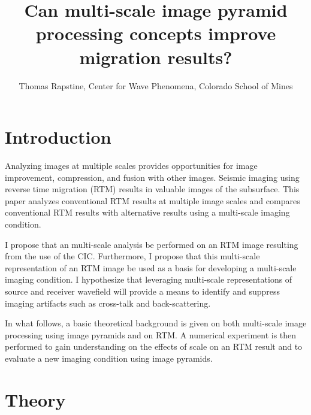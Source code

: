 \title{Can multi-scale image pyramid processing concepts improve migration results?}
\author{Thomas Rapstine, Center for Wave Phenomena, Colorado School of Mines}

%

\def\req{equation~\ref}
\def\rfn#1{\ref{fig:#1}}


\maketitle
{}



\section{Introduction}

Analyzing images at multiple scales provides opportunities for image improvement, compression, and fusion with other images.  Seismic imaging using reverse time migration (RTM) results in valuable images of the subsurface.  This paper analyzes conventional RTM results at multiple image scales and compares conventional RTM results with alternative results using a multi-scale imaging condition.

I propose that an multi-scale analysis be performed on an RTM image resulting from the use of the CIC.  Furthermore, I propose that this multi-scale representation of an RTM image be used as a basis for developing a multi-scale imaging condition.  I hypothesize that leveraging multi-scale representations of source and receiver wavefield will provide a means to identify and suppress imaging artifacts such as cross-talk and back-scattering. 

In what follows, a basic theoretical background is given on both multi-scale image processing using image pyramids and on RTM.  A numerical experiment is then performed to gain understanding on the effects of scale on an RTM result and to evaluate a new imaging condition using image pyramids.

\section{Theory}

